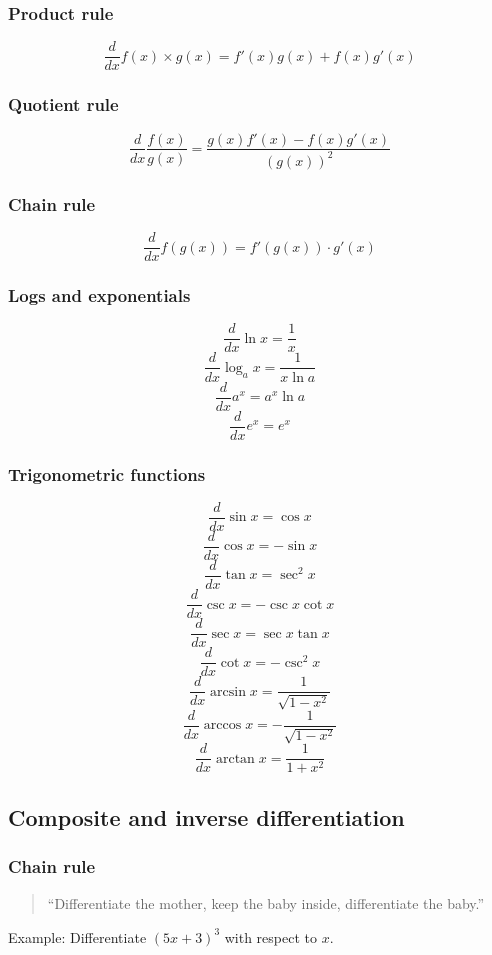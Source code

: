 \documentclass[letterpaper, 12pt]{article}
\begin{document}
\subsubsection*{Product rule}
$$\frac{d}{dx}  f(x) \times g(x) = f'(x)g(x) + f(x)g'(x)$$

\subsubsection*{Quotient rule}
$$\frac{d}{dx}  \frac{f(x)}{g(x)} = \frac{g(x)f'(x) - f(x)g'(x)}{(g(x))^2}$$

\subsubsection*{Chain rule}
$$\frac{d}{dx}  f(g(x)) = f'(g(x)) \cdot g'(x)$$

\subsubsection*{Logs and exponentials}
$$\frac{d}{dx}  \ln x= \frac{1}{x}$$
$$\frac{d}{dx}  \log_a x= \frac{1}{x \ln a}$$
$$\frac{d}{dx}  a^x= a^x \ln a$$
$$\frac{d}{dx}  e^x= e^x$$

\subsubsection*{Trigonometric functions}
$$\frac{d}{dx}  \sin x= \cos x$$
$$\frac{d}{dx}  \cos x= -\sin x$$
$$\frac{d}{dx}  \tan x= \sec^2 x$$
$$\frac{d}{dx}  \csc x= -\csc x \cot x$$
$$\frac{d}{dx}  \sec x= \sec x \tan x$$
$$\frac{d}{dx}  \cot x= -\csc^2 x$$
$$\frac{d}{dx}  \arcsin x= \frac{1}{\sqrt{1-x^2}}$$
$$\frac{d}{dx}  \arccos x= -\frac{1}{\sqrt{1-x^2}}$$
$$\frac{d}{dx}  \arctan x= \frac{1}{1+x^2}$$

\subsection*{Composite and inverse differentiation}

\subsubsection*{Chain rule}
\begin{quote}
``Differentiate the mother, keep the baby inside, differentiate the baby.''
\end{quote}

Example: Differentiate $(5x+3)^3$ with respect to $x$.
\end{document}
